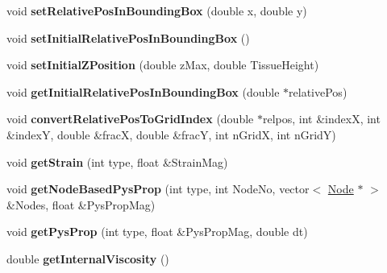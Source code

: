 \begin{DoxyCompactItemize}
\item 
\hypertarget{classShapeBase_a71d8a64fec5591d51c6d54ea76711e0d}{}void {\bfseries set\+Relative\+Pos\+In\+Bounding\+Box} (double x, double y)\label{classShapeBase_a71d8a64fec5591d51c6d54ea76711e0d}

\item 
\hypertarget{classShapeBase_a8c7a7578407be503531bf14af6d004d1}{}void {\bfseries set\+Initial\+Relative\+Pos\+In\+Bounding\+Box} ()\label{classShapeBase_a8c7a7578407be503531bf14af6d004d1}

\item 
\hypertarget{classShapeBase_a3e054f84b56303812eee5b3abeec9b2f}{}void {\bfseries set\+Initial\+Z\+Position} (double z\+Max, double Tissue\+Height)\label{classShapeBase_a3e054f84b56303812eee5b3abeec9b2f}

\item 
\hypertarget{classShapeBase_af2e6905d811de3ca73c0971b3fd21225}{}void {\bfseries get\+Initial\+Relative\+Pos\+In\+Bounding\+Box} (double $\ast$relative\+Pos)\label{classShapeBase_af2e6905d811de3ca73c0971b3fd21225}

\item 
\hypertarget{classShapeBase_ad34b6e8535ad7a534110f03792f5f5d1}{}void {\bfseries convert\+Relative\+Pos\+To\+Grid\+Index} (double $\ast$relpos, int \&index\+X, int \&index\+Y, double \&frac\+X, double \&frac\+Y, int n\+Grid\+X, int n\+Grid\+Y)\label{classShapeBase_ad34b6e8535ad7a534110f03792f5f5d1}

\item 
\hypertarget{classShapeBase_aecf99016ea7c36e0bff43a40e6a89df3}{}void {\bfseries get\+Strain} (int type, float \&Strain\+Mag)\label{classShapeBase_aecf99016ea7c36e0bff43a40e6a89df3}

\item 
\hypertarget{classShapeBase_ac1368b84a5ed722fa7b9f82656b49969}{}void {\bfseries get\+Node\+Based\+Pys\+Prop} (int type, int Node\+No, vector$<$ \hyperlink{classNode}{Node} $\ast$ $>$ \&Nodes, float \&Pys\+Prop\+Mag)\label{classShapeBase_ac1368b84a5ed722fa7b9f82656b49969}

\item 
\hypertarget{classShapeBase_abff91451c3465778ed89624d6196f7f6}{}void {\bfseries get\+Pys\+Prop} (int type, float \&Pys\+Prop\+Mag, double dt)\label{classShapeBase_abff91451c3465778ed89624d6196f7f6}

\item 
\hypertarget{classShapeBase_a51bc2c7303dfaae0687d1d785b077e81}{}double {\bfseries get\+Internal\+Viscosity} ()\label{classShapeBase_a51bc2c7303dfaae0687d1d785b077e81}


\end{DoxyCompactItemize}
